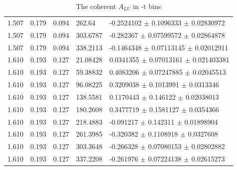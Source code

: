 \begin{table}[!h]
\begin{center}
\begin{tabular}{||l|l|l|l|l||}
           1.507 & 0.179 & 0.094 &  262.64     & -0.2524102  $\pm$  0.1096333    $\pm$  0.02830972      \\
           1.507 & 0.179 & 0.094 &  303.6787   & -0.282367   $\pm$  0.07599572   $\pm$  0.02864878      \\
           1.507 & 0.179 & 0.094 &  338.2113   & -0.1464348  $\pm$  0.07113145   $\pm$  0.02012911      \\
         \hline                                                                       
         1.610 & 0.193 & 0.127 &  21.08428   & 0.0341355   $\pm$  0.07013161   
         $\pm$   0.021403381     \\
           1.610 & 0.193 & 0.127 &  59.38832   & 0.4083206   $\pm$  0.07247885   $\pm$   0.02045513      \\
           1.610 & 0.193 & 0.127 &  96.08225   & 0.3209038   $\pm$  0.1013991    $\pm$   0.0313346       \\
           1.610 & 0.193 & 0.127 &  138.5581   & 0.1170443   $\pm$  0.146122     $\pm$   0.02038013      \\
           1.610 & 0.193 & 0.127 &  180.2608   & 0.3477719   $\pm$  0.1581127    $\pm$   0.0354366       \\
           1.610 & 0.193 & 0.127 &  218.4883   & -0.091217   $\pm$  0.142311     $\pm$   0.01898904      \\
           1.610 & 0.193 & 0.127 &  261.3985   & -0.320382   $\pm$  0.1108918    $\pm$   0.0327608       \\
           1.610 & 0.193 & 0.127 &  303.3648   & -0.266328   $\pm$  0.07080153   $\pm$   0.02802882      \\
           1.610 & 0.193 & 0.127 &  337.2208   & -0.261976   $\pm$  0.07224138   $\pm$   0.02615273      \\
         \hline
         \hline
      \end{tabular}
      \caption{The coherent $A_{LU}$ in -t bins}
      \label{table:Coh_t_BSA}
   \end{center}
\end{table}


